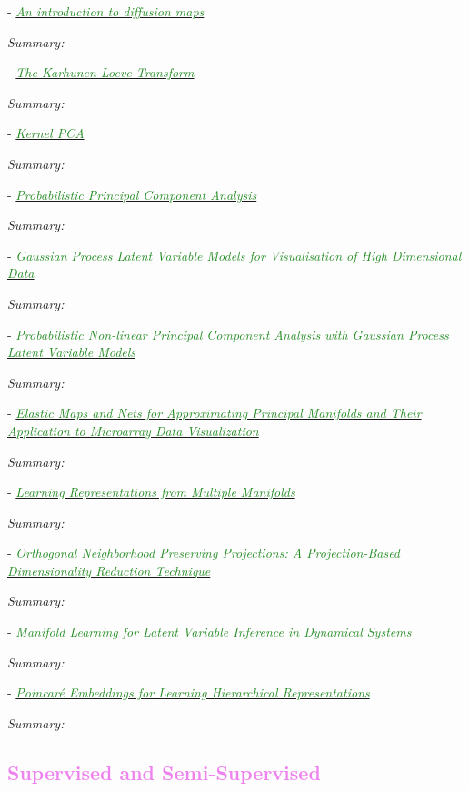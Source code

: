 \documentclass[]{article}
\newcommand{\paperentry}[4]{
            \hangindent=1cm
            \textcolor{red}{\cite{#1}} - \href{run:../References/#3}{\textcolor{ForestGreen}{\textit{#2}}}
            
            \noindent            
            \begin{minipage}[t]{0.1\linewidth}\hfill\end{minipage}
            \begin{minipage}[t]{0.8\linewidth}\textcolor{NavyBlue}{{\textit{Summary:}}}#4\end{minipage}
            \vspace{.25cm}
          }
\begin{document}
	\paperentry{Delaporte2008DiffusionMaps}
	{An introduction to diffusion maps}
	{Manifold_Representation_Learning/Manifold/Delaporte2008DiffusionMaps}
	{}
	
	\paperentry{Theodoris2008PCA}
	{The Karhunen-Loeve Transform}
	{}
	{}
	
	\paperentry{Theodoris2008KPCA}
	{Kernel PCA}
	{}
	{}
	
	\paperentry{Tipping1999PPCA}
	{Probabilistic Principal Component Analysis}
	{Manifold_Representation_Learning/Manifold/Tipping1999PPCA.pdf}
	{}
	
	\paperentry{Lawrence2003GPLVM}
	{Gaussian Process Latent Variable Models for Visualisation of High Dimensional Data}
	{Manifold_Representation_Learning/Manifold/Lawrence2003GPLVM.pdf}
	{}
	
	\paperentry{Lawrence2005PPCAGPLVModels}
	{Probabilistic Non-linear Principal Component Analysis with Gaussian Process Latent Variable Models}
	{Manifold_Representation_Learning/Manifold/Lawrence2005PPCAGPLVModels.pdf}
	{}
	
	\paperentry{Gorban2007ElasticMaps}
	{Elastic Maps and Nets for Approximating Principal Manifolds and Their Application to Microarray Data Visualization}
	{Manifold_Representation_Learning/Manifold/Gorban2007ElasticMaps.pdf}
	{}
	
	\paperentry{Lee2015MultipleManifolds}
	{Learning Representations from Multiple Manifolds}
	{Manifold_Representation_Learning/Manifold/Lee2015MultipleManifolds.pdf}
	{}
	
	\paperentry{Kokiopoulou2007OrthoNeighborhoodPreservingProjections}
	{Orthogonal Neighborhood Preserving Projections: A Projection-Based Dimensionality Reduction Technique}
	{Manifold_Representation_Learning/Manifold/Kokiopoulou2007OrthoNeighborhoodPreservingProjections.pdf}
	{}
	
	\paperentry{Talmon2015ManifoldLearningInDynamicalSystems}
	{Manifold Learning for Latent Variable Inference in Dynamical Systems}
	{Manifold_Representation_Learning/Manifold/Talmon2015ManifoldLearningInDynamicalSystems.pdf}
	{}
	
	\paperentry{Nickel2017PoincareEmbeddings}
	{Poincar\'{e} Embeddings for Learning Hierarchical Representations}
	{Manifold_Representation_Learning/Manifold/Nickel2017PoincareEmbeddings.pdf}
	{}
	
	\textcolor{Violet}{\subsection{Supervised and Semi-Supervised}}
	
\end{document}
